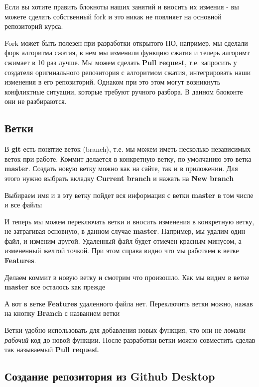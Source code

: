 \documentclass[11pt]{article}
\begin{document}
Если вы хотите править блокноты наших занятий и вносить их измения - вы
можете сделать собственный fork и это никак не повлияет на основной
репозиторий курса.

Fork может быть полезен при разработки открытого ПО, например, мы
сделали форк алгоритма сжатия, в нем мы изменили функцию сжатия и теперь
алгоримт сжимает в 10 раз лучше. Мы можем сделать \textbf{Pull request},
т.е. запросить у создателя оригинального репозитория с алгоритмом
сжатия, интегрировать наши изменения в его репозиторий. Однаком при это
этом могут возникнуть конфликтные ситуации, которые требуют ручного
разбора. В данном блоконте они не разбираются.

    \subsection{Ветки}\label{ux432ux435ux442ux43aux438}

В \textbf{git} есть понятие веток (branch), т.е. мы можем иметь
несколько независимых веток при работе. Коммит делается в конкретную
ветку, по умолчанию это ветка \textbf{master}. Создать новую ветку можно
как на сайте, так и в приложении. Для этого нужно выбрать вкладку
\textbf{Current branch} и нажать на \textbf{New branch}

Выбираем имя и в эту ветку пойдет вся информация с ветки \textbf{master}
в том числе и все файлы

И теперь мы можем переключать ветки и вносить изменения в конкретную
ветку, не затрагивая основную, в данном случае \textbf{master}.
Например, мы удалим один файл, и изменим другой. Удаленный файл будет
отмечен красным минусом, а измененный желтой точкой. При этом справа
видно что мы работаем в ветке \textbf{Features}.

Делаем коммит в новую ветку и смотрим что произошло. Как мы видим в
ветке \textbf{master} все осталось как прежде

А вот в ветке \textbf{Features} удаленного файла нет. Переключить ветки
можно, нажав на кнопку \textbf{Branch} с названием ветки

Ветки удобно использовать для добавления новых функция, что они не
ломали \emph{рабочий} код до новой функции. После разработки ветки можно
совместить сделав так называемый \textbf{Pull request}.

    \subsection{Создание репозитория из Github
Desktop}\label{ux441ux43eux437ux434ux430ux43dux438ux435-ux440ux435ux43fux43eux437ux438ux442ux43eux440ux438ux44f-ux438ux437-github-desktop}
\end{document}
